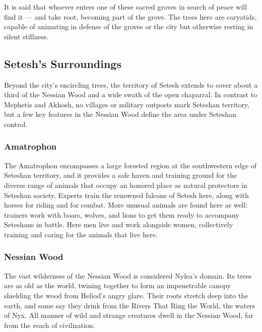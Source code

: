         \vspace{7.4cm}

        It is said that whoever enters one of these sacred groves in search of peace will find it --- and take root, becoming part of the grove.
        The trees here are caryatids, capable of animating in defense of the groves or the city but otherwise resting in silent stillness.

\subsection*{Setesh's Surroundings}
    Beyond the city's encircling trees, the territory of Setesh extends to cover about a third of the Nessian Wood and a wide swath of the open chaparral.
    In contrast to Mephetis and Akhosh, no villages or military outposts mark Seteshan territory, but a few key features in the Nessian Wood define the area under Seteshan control.

    \subsubsection{Amatrophon}
        The Amatrophon encompasses a large forested region at the southwestern edge of Seteshan territory, and it provides a safe haven and training ground for the diverse range of animals that occupy an honored place as natural protectors in Seteshan society.
        Experts train the renowned falcons of Setesh here, along with horses for riding and for combat.
        More unusual animals are found here as well: trainers work with boars, wolves, and lions to get them ready to accompany Seteshans in battle.
        Here men live and work alongside women, collectively training and caring for the animals that live here.

    \subsubsection{Nessian Wood}
        The vast wilderness of the Nessian Wood is considered Nylea's domain.
        Its trees are as old as the world, twining together to form an impenetrable canopy shielding the wood from Heliod's angry glare.
        Their roots stretch deep into the earth, and some say they drink from the Rivers That Ring the World, the waters of Nyx.
        All manner of wild and strange creatures dwell in the Nessian Wood, far from the reach of civilization.

